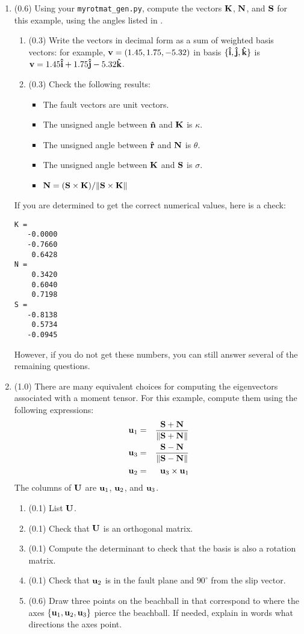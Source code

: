 \documentclass[11pt,titlepage,fleqn]{article}
\newcommand{\rotvec}{\bv}      %
\begin{document}
\begin{enumerate}

\item (0.6) Using your \verb+myrotmat_gen.py+, compute the vectors $\mbox{${\bf K}$}$, $\mbox{${\bf N}$}$, and $\mbox{${\bf S}$}$ for this example, using the angles listed in .
%
\begin{enumerate}
\item (0.3) Write the vectors in decimal form as a sum of weighted basis vectors: for example, $\mbox{${\bf v}$} = (1.45,1.75,-5.32)$ in basis $\{\mbox{\boldmath{$\hat{\rm i}$}},\mbox{\boldmath{$\hat{\rm j}$}},\mbox{\boldmath{$\hat{\rm k}$}}\}$ is $\rotvec = 1.45\bih + 1.75\bjh - 5.32\bkh$.

\item (0.3) Check the following results:
%
\begin{itemize}
\item The fault vectors are unit vectors.
\item The unsigned angle between $\mbox{\boldmath{$\hat{\rm n}$}}$ and $\mbox{${\bf K}$}$ is $\kappa$.
\item The unsigned angle between $\mbox{\boldmath{$\hat{\rm r}$}}$ and $\mbox{${\bf N}$}$ is $\theta$.
\item The unsigned angle between $\mbox{${\bf K}$}$ and $\mbox{${\bf S}$}$ is $\sigma$.
\item $\mbox{${\bf N}$} = (\mbox{${\bf S}$} \times \mbox{${\bf K}$})/\| \mbox{${\bf S}$} \times \mbox{${\bf K}$} \|$
\end{itemize}

\end{enumerate}
%
If you are determined to get the correct numerical values, here is a check:
%
\begin{verbatim}
K =
   -0.0000
   -0.7660
    0.6428
N =
    0.3420
    0.6040
    0.7198
S =
   -0.8138
    0.5734
   -0.0945
\end{verbatim}
%
However, if you do not get these numbers, you can still answer several of the remaining questions.


\item (1.0) There are many equivalent choices for computing the eigenvectors associated with a moment tensor. For this example, compute them using the following expressions:
%
\begin{eqnarray*}
\mbox{${\bf u}$}_1 &=& \frac{\mbox{${\bf S}$} + \mbox{${\bf N}$}}{\| \mbox{${\bf S}$} + \mbox{${\bf N}$} \|}
\\
\mbox{${\bf u}$}_3 &=& \frac{\mbox{${\bf S}$} - \mbox{${\bf N}$}}{\| \mbox{${\bf S}$} - \mbox{${\bf N}$} \|}
\\
\mbox{${\bf u}$}_2 &=& \mbox{${\bf u}$}_3  \times \mbox{${\bf u}$}_1
\end{eqnarray*}
%
The columns of $\mbox{${\bf U}$}$ are $\mbox{${\bf u}$}_1$, $\mbox{${\bf u}$}_2$, and $\mbox{${\bf u}$}_3$.
%
\begin{enumerate}
\item (0.1) List $\mbox{${\bf U}$}$.
\item (0.1) Check that $\mbox{${\bf U}$}$ is an orthogonal matrix.
\item (0.1) Compute the determinant to check that the basis is also a rotation matrix.
\item (0.1) Check that $\mbox{${\bf u}$}_2$ is in the fault plane and $90^\circ$ from the slip vector.
\item (0.6) Draw three points on the beachball in  that correspond to where the axes $\{\mbox{${\bf u}$}_1,\mbox{${\bf u}$}_2,\mbox{${\bf u}$}_3\}$ pierce the beachball. If needed, explain in words what directions the axes point.
\end{enumerate}


\end{enumerate}
\end{document}
